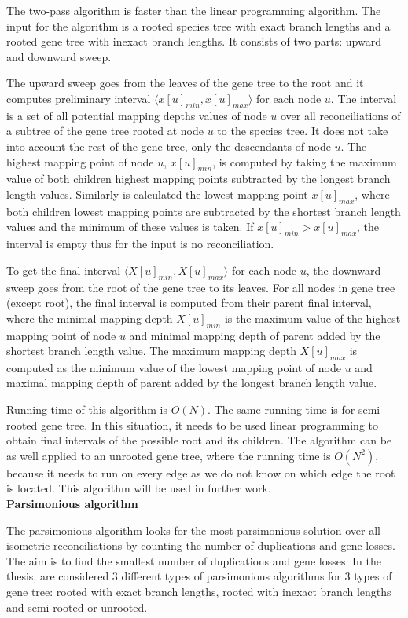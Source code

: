 The two-pass algorithm is faster than the linear programming algorithm. The input for the algorithm is a rooted species tree with exact branch lengths and a rooted gene tree with inexact branch lengths. It consists of two parts: upward and downward sweep. 

The upward sweep goes from the leaves of the gene tree to the root and it computes preliminary interval $\langle x[u]_{min}, x[u]_{max} \rangle$ for each node $u$. The interval is a set of all potential mapping depths values of node $u$ over all reconciliations of a subtree of the gene tree rooted at node $u$ to the species tree. It does not take into account the rest of the gene tree, only the descendants of node $u$. The highest mapping point of node $u$, $x[u]_{min}$, is computed by taking the maximum value of both children highest mapping points subtracted by the longest branch length values. Similarly is calculated the lowest mapping point $x[u]_{max}$, where both children lowest mapping points are subtracted by the shortest branch length values and the minimum of these values is taken. If $x[u]_{min} > x[u]_{max}$, the interval is empty thus for the input is no reconciliation.

To get the final interval $\langle X[u]_{min}, X[u]_{max} \rangle$ for each node $u$, the downward sweep goes from the root of the gene tree to its leaves.
For all nodes in gene tree (except root), the final interval is computed from their parent final interval, where the minimal mapping depth $X[u]_{min}$ is the maximum value of the highest mapping point of node $u$ and minimal mapping depth of parent added by the shortest branch length value. The maximum mapping depth $X[u]_{max}$ is computed as the minimum value of the lowest mapping point of node $u$ and maximal mapping depth of parent added by the longest branch length value.

Running time of this algorithm is $O(N)$. The same running time is for semi-rooted gene tree. In this situation, it needs to be used linear programming to obtain final intervals of the possible root and its children. The algorithm can be as well applied to an unrooted gene tree, where the running time is $O(N^2)$, because it needs to run on every edge as we do not know on which edge the root is located. This algorithm will be used in further work.\\
\textbf{Parsimonious algorithm}

The parsimonious algorithm looks for the most parsimonious solution over all isometric reconciliations by counting the number of duplications and gene losses. The aim is to find the smallest number of duplications and gene losses. In the thesis, \cite{chladek_thesis} are considered 3 different types of parsimonious algorithms for 3 types of gene tree: rooted with exact branch lengths, rooted with inexact branch lengths and semi-rooted or unrooted.

